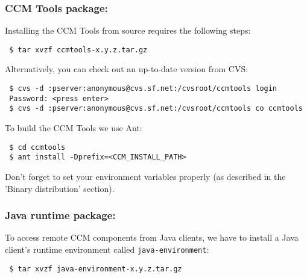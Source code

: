 \subsubsection{CCM Tools package:}
Installing the CCM Tools from source requires the following steps:

\begin{small}
\begin{verbatim} 
 $ tar xvzf ccmtools-x.y.z.tar.gz
\end{verbatim}
\end{small}

\noindent
Alternatively, you can check out an up-to-date version from CVS:
\begin{small}
\begin{verbatim}
 $ cvs -d :pserver:anonymous@cvs.sf.net:/cvsroot/ccmtools login
 Password: <press enter>
 $ cvs -d :pserver:anonymous@cvs.sf.net:/cvsroot/ccmtools co ccmtools
\end{verbatim}
\end{small}

\noindent
To build the CCM Tools we use Ant: 
\begin{small}
\begin{verbatim}
 $ cd ccmtools
 $ ant install -Dprefix=<CCM_INSTALL_PATH>
\end{verbatim}
\end{small}

\noindent
Don't forget to set your environment variables properly
(as described in the 'Binary distribution' section). 


\subsubsection{Java runtime package:}
To access remote CCM components from Java clients, we have to install
a Java client's runtime environment called {\tt java-environment}:

\begin{small}
\begin{verbatim}
 $ tar xvzf java-environment-x.y.z.tar.gz
\end{verbatim}
\end{small}

